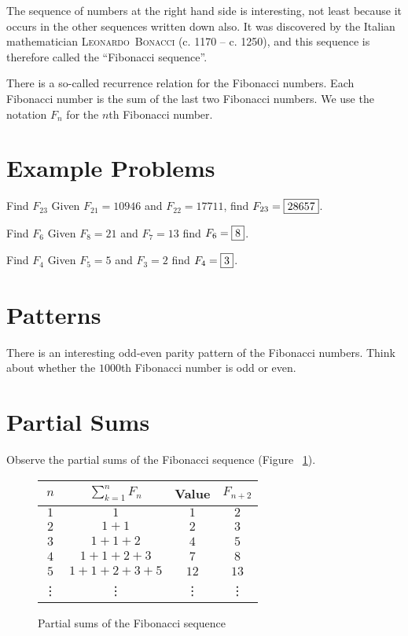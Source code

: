 \documentclass[a4paper,10pt]{report}
\begin{document}
The sequence of numbers at the right hand side is interesting, not least because
it occurs in the other sequences written down also. It was discovered by the
Italian mathematician \textsc{Leonardo~Bonacci} (c. 1170 -- c. 1250), and this
sequence is therefore called the ``Fibonacci sequence''.

There is a so-called recurrence relation for the Fibonacci numbers. Each
Fibonacci number is the sum of the last two Fibonacci numbers. We use the
notation $F_n$ for the $n$th Fibonacci number.

\section{Example Problems}

\begin{problem}{Find $F_{23}$}
 Given $F_{21}=10946$ and $F_{22}=17711$, find $F_{23}=\Ans{28657}$.
\end{problem}

\begin{problem}{Find $F_6$}
 Given $F_8=21$ and $F_7=13$ find $F_6=\Ans{8}$.
\end{problem}

\begin{problem}{Find $F_4$}
 Given $F_5=5$ and $F_3=2$ find $F_4=\Ans{3}$.
\end{problem}

\section{Patterns}

There is an interesting odd-even parity pattern of the Fibonacci numbers. Think
about whether the $1000$th Fibonacci number is odd or even.

\section{Partial Sums}

Observe the partial sums of the Fibonacci sequence (Figure
~\ref{fib:partialsums}).

\begin{figure}
 \begin{tabular}{|c|c|c|c|}
  \hline
  $n$ & $\displaystyle \sum_{k=1}^n F_n$ & Value & $F_{n+2}$ \\
  \hline
  $1$ & $1$ & $1$ & $2$ \\
  $2$ & $1+1$ & $2$ & $3$ \\
  $3$ & $1+1+2$ & $4$ & $5$ \\
  $4$ & $1+1+2+3$ & $7$ & $8$ \\
  $5$ & $1+1+2+3+5$ & $12$ & $13$ \\
  \vdots & \vdots & \vdots & \vdots \\
  \hline
 \end{tabular}

 \caption{Partial sums of the Fibonacci sequence}

 \label{fib:partialsums}
\end{figure}

\printglossaries

\cleardoublepage
{}
\listoffigures
\end{document}
